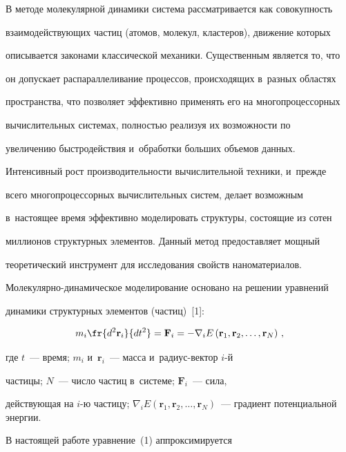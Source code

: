   В методе молекулярной динамики система рассматривается как совокупность 

взаимодействующих частиц (атомов, молекул, кластеров), движение которых 

описывается законами классической механики. Существенным является то, что 

он допускает распараллеливание процессов, происходящих в~разных областях 

пространства, что позволяет эффективно применять его на многопроцессорных 

вычислительных системах, полностью реализуя их возможности по 

увеличению быстродействия и~обработки больших объемов данных. 

Интенсивный рост производительности вычислительной техники, и~прежде 

всего многопроцессорных вычислительных систем, делает возможным 

в~настоящее время эффективно моделировать структуры, состоящие из сотен 

миллионов структурных элементов. Данный метод предоставляет мощный 

теоретический инструмент для исследования свойств наноматериалов.

  

  Молекулярно-динамическое моделирование основано на решении уравнений 

динамики структурных элементов (частиц)~[1]:

  \begin{equation}

  m_i\fr{d^2\mathbf{r}_i}{dt^2}=\mathbf{F}_i=-\nabla_i E\left(\mathbf{r}_1, 

\mathbf{r}_2,\ldots ,\mathbf{r}_N\right)\,,

  \label{e1-sem}

  \end{equation}

где $t$~--- время; $m_i$ и~$\mathbf{r}_i$~--- масса и~ра\-ди\-ус-век\-тор $i$-й 

частицы; $N$~--- число час\-тиц в~системе; $\mathbf{F}_i$~--- сила, 

действующая на $i$-ю частицу; $\nabla_iE(\mathbf{r}_1, \mathbf{r}_2,\ldots, 

\mathbf{r}_N)$~--- градиент потенциальной энергии.

  

  В настоящей работе уравнение~(1) аппроксимируется  

